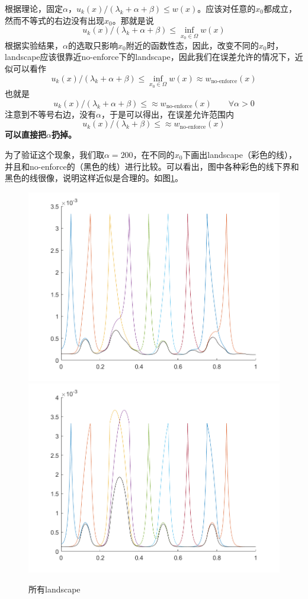 \documentclass[12pt,a4paper]{article}
\begin{document}
根据理论，固定$\alpha$，$u_k(x) / (\lambda_k + \alpha + \beta) \leq w(x)$。应该对任意的$x_0$都成立，然而不等式的右边没有出现$x_0$。那就是说
\begin{equation}
u_k(x) / (\lambda_k + \alpha + \beta) \leq \inf_{x_0 \in \Omega} w(x)
\end{equation}
根据实验结果，$\alpha$的选取只影响$x_0$附近的函数性态，因此，改变不同的$x_0$时，landscape应该很靠近no-enforce下的landscape，因此我们在误差允许的情况下，近似可以看作
\begin{equation}
u_k(x) / (\lambda_k + \alpha + \beta) \leq \inf_{x_0 \in \Omega} w(x) \approx w_{\text{no-enforce}} (x)
\end{equation}
也就是
\begin{equation}
u_k(x) / (\lambda_k + \alpha + \beta) \leq \approx w_{\text{no-enforce}} (x) \qquad \forall \alpha > 0
\end{equation}
注意到不等号右边，没有$\alpha$，于是可以得出，在误差允许范围内
\begin{equation}
u_k(x) / (\lambda_k + \beta) \leq \approx w_{\text{no-enforce}} (x)
\end{equation}
\textbf{可以直接把$\alpha$扔掉。}

为了验证这个现象，我们取$\alpha=200$，在不同的$x_0$下画出landscape（彩色的线），并且和no-enforce的（黑色的线）进行比较。可以看出，图中各种彩色的线下界和黑色的线很像，说明这样近似是合理的。如图\ref{INF}。
\begin{figure}[htbp]
\centering
\includegraphics[width=0.3\linewidth]{parameter/INF1}
\includegraphics[width=0.3\linewidth]{parameter/INF2}
\caption{所有landscape}
\label{INF}
\end{figure}
\end{document}
